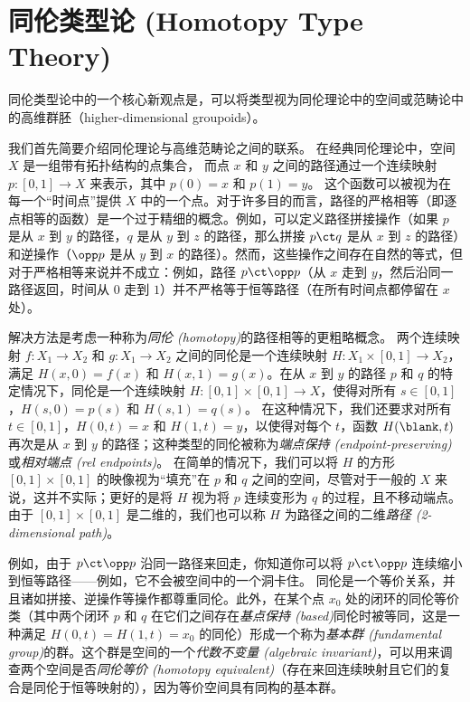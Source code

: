 \chapter{同伦类型论 (Homotopy Type Theory)}
\label{cha:basics}

同伦类型论中的一个核心新观点是，可以将类型视为同伦理论中的空间或范畴论中的高维群胚（higher-dimensional groupoids）。

我们首先简要介绍同伦理论与高维范畴论之间的联系。
在经典同伦理论中，空间 $X$ 是一组带有拓扑结构的点集合，
而点 $x$ 和 $y$ 之间的路径通过一个连续映射 $p : [0,1] \to X$ 来表示，其中 $p(0) = x$ 和 $p(1) = y$。
这个函数可以被视为在每一个“时间点”提供 $X$ 中的一个点。对于许多目的而言，路径的严格相等（即逐点相等的函数）是一个过于精细的概念。例如，可以定义路径拼接操作（如果 $p$ 是从 $x$ 到 $y$ 的路径，$q$ 是从 $y$ 到 $z$ 的路径，那么拼接 $p \ct q$ 是从 $x$ 到 $z$ 的路径）和逆操作（$\opp p$ 是从 $y$ 到 $x$ 的路径）。然而，这些操作之间存在自然的等式，但对于严格相等来说并不成立：例如，路径 $p \ct \opp p$（从 $x$ 走到 $y$，然后沿同一路径返回，时间从 $0$ 走到 $1$）并不严格等于恒等路径（在所有时间点都停留在 $x$ 处）。

解决方法是考虑一种称为\emph{同伦 (homotopy)}的路径相等的更粗略概念。
两个连续映射 $f : X_1 \to X_2$ 和 $g : X_1 \to X_2$ 之间的同伦是一个连续映射 $H : X_1 \times [0, 1] \to X_2$，满足 $H(x, 0) = f(x)$ 和 $H(x, 1) = g(x)$。在从 $x$ 到 $y$ 的路径 $p$ 和 $q$ 的特定情况下，同伦是一个连续映射 $H : [0,1] \times [0,1] \rightarrow X$，使得对所有 $s\in [0,1]$，$H(s,0) = p(s)$ 和 $H(s,1) = q(s)$。
在这种情况下，我们还要求对所有 $t\in [0,1]$，$H(0,t) = x$ 和 $H(1,t)=y$，以使得对每个 $t$，函数 $H(\blank,t)$ 再次是从 $x$ 到 $y$ 的路径；这种类型的同伦被称为\emph{端点保持 (endpoint-preserving)}或\emph{相对端点 (rel endpoints)}。
在简单的情况下，我们可以将 $H$ 的方形 $[0,1]\times [0,1]$ 的映像视为“填充”在 $p$ 和 $q$ 之间的空间，尽管对于一般的 $X$ 来说，这并不实际；更好的是将 $H$ 视为将 $p$ 连续变形为 $q$ 的过程，且不移动端点。
由于 $[0,1]\times [0,1]$ 是二维的，我们也可以称 $H$ 为路径之间的二维\emph{路径 (2-dimensional path)}。

例如，由于 $p \ct \opp p$ 沿同一路径来回走，你知道你可以将 $p \ct \opp p$ 连续缩小到恒等路径——例如，它不会被空间中的一个洞卡住。
同伦是一个等价关系，并且诸如拼接、逆操作等操作都尊重同伦。此外，在某个点 $x_0$ 处的闭环的同伦等价类（其中两个闭环 $p$ 和 $q$ 在它们之间存在\emph{基点保持 (based)}同伦时被等同，这是一种满足 $H(0,t) = H(1,t) = x_0$ 的同伦）形成一个称为\emph{基本群 (fundamental group)}的群。这个群是空间的一个\emph{代数不变量 (algebraic invariant)}，可以用来调查两个空间是否\emph{同伦等价 (homotopy equivalent)}（存在来回连续映射且它们的复合是同伦于恒等映射的），因为等价空间具有同构的基本群。

